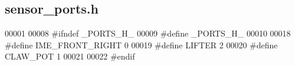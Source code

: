 \subsection{sensor\+\_\+ports.\+h}
\label{sensor__ports_8h_source}

\begin{DoxyCode}
00001 
00008 \textcolor{preprocessor}{#ifndef \_PORTS\_H\_}
00009 \textcolor{preprocessor}{#define \_PORTS\_H\_}
00010 
00018 \textcolor{preprocessor}{#define IME\_FRONT\_RIGHT 0}
00019 \textcolor{preprocessor}{#define LIFTER 2}
00020 \textcolor{preprocessor}{#define CLAW\_POT 1}
00021 
00022 \textcolor{preprocessor}{#endif}
\end{DoxyCode}
